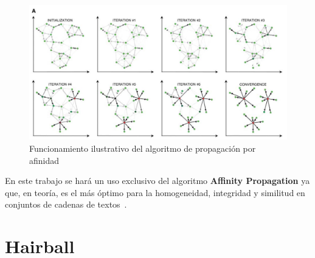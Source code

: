 \documentclass[a4paper, 12pt]{book}
\begin{document}
\begin{figure}[!htb]
    \centering
    \includegraphics[width=16cm, keepaspectratio]{img/affinitypropagation.jpg}
    \caption{Funcionamiento ilustrativo del algoritmo de propagación por afinidad}
    \label{fig:affinitypropagation}
\end{figure}

En este trabajo se hará un uso exclusivo del algoritmo \textbf{Affinity Propagation} ya que, en teoría, es el más óptimo para la homogeneidad, integridad y similitud en conjuntos de cadenas de textos~\cite{areed2020python}.



\section{Hairball} 
\label{sec:Hairball}
\end{document}
